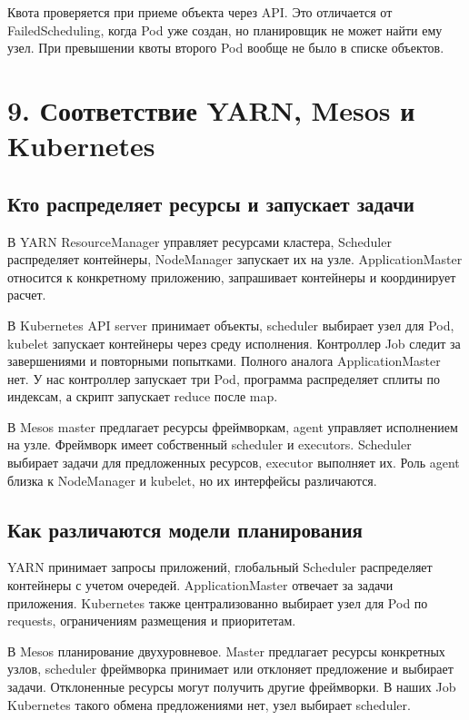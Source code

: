 Квота проверяется при приеме объекта через API. Это отличается от
FailedScheduling, когда Pod уже создан, но планировщик не может найти ему
узел. При превышении квоты второго Pod вообще не было в списке объектов.

\newpage
\section{9. Соответствие YARN, Mesos и Kubernetes}

\subsection{Кто распределяет ресурсы и запускает задачи}

В YARN ResourceManager управляет ресурсами кластера, Scheduler распределяет
контейнеры, NodeManager запускает их на узле. ApplicationMaster относится
к конкретному приложению, запрашивает контейнеры и координирует расчет.

В Kubernetes API server принимает объекты, scheduler выбирает узел для
Pod, kubelet запускает контейнеры через среду исполнения. Контроллер Job
следит за завершениями и повторными попытками. Полного аналога
ApplicationMaster нет. У нас контроллер запускает три Pod, программа
распределяет сплиты по индексам, а скрипт запускает reduce после map.

В Mesos master предлагает ресурсы фреймворкам, agent управляет исполнением
на узле. Фреймворк имеет собственный scheduler и executors. Scheduler
выбирает задачи для предложенных ресурсов, executor выполняет их.
Роль agent близка к NodeManager и kubelet, но их интерфейсы различаются.

\subsection{Как различаются модели планирования}

YARN принимает запросы приложений, глобальный Scheduler распределяет
контейнеры с учетом очередей. ApplicationMaster отвечает за задачи
приложения. Kubernetes также централизованно выбирает узел для Pod
по requests, ограничениям размещения и приоритетам.

В Mesos планирование двухуровневое. Master предлагает ресурсы конкретных
узлов, scheduler фреймворка принимает или отклоняет предложение и выбирает
задачи. Отклоненные ресурсы могут получить другие фреймворки. В наших Job
Kubernetes такого обмена предложениями нет, узел выбирает scheduler.

